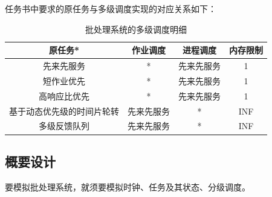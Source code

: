 \documentclass[UTF8]{ctexart}
\begin{document}
任务书中要求的原任务与多级调度实现的对应关系如下：
\begin{table}[htbp]
    \caption{批处理系统的多级调度明细}
    \centering
    \begin{tabular}{cccc}
        \toprule
        原任务*                    & 作业调度   & 进程调度   & 内存限制 \\
        \midrule
        先来先服务                 & *          & 先来先服务 & 1        \\
        短作业优先                 & *          & 先来先服务 & 1        \\
        高响应比优先               & *          & 先来先服务 & 1        \\
        \midrule
        基于动态优先级的时间片轮转 & 先来先服务 & *          & INF      \\
        多级反馈队列               & 先来先服务 & *          & INF      \\
        \bottomrule
    \end{tabular}
    \qquad
\end{table}

\subsection{概要设计} \label{v0}

要模拟批处理系统，就须要模拟时钟、任务及其状态、分级调度。
\end{document}
